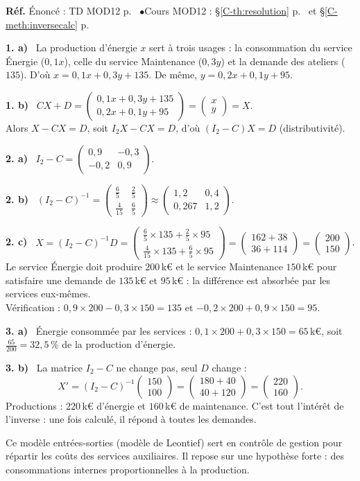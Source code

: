 \documentclass[a4paper,11pt]{article}
\newcommand{\M}[1]{\begin{pmatrix}#1\end{pmatrix}}
\newcommand{\cours}[1]{§\ref{C-#1} p.~\pageref{C-#1}}
\newcommand{\source}[2]{{\footnotesize\color{uimmgray}\textbf{Réf.} \enspace Énoncé : TD MOD12 p.~\pageref{T-#1} \enspace$\bullet$\enspace Cours MOD12 : #2}\par\smallskip}
\newcommand{\q}[1]{\textbf{\color{uimmblue}#1}\ }
\begin{document}
\begin{correction}
\source{exo:pb}{\cours{th:resolution} et \cours{meth:inversecalc}}
\q{1. a)} La production d'énergie $x$ sert à trois usages : la consommation du service Énergie ($0{,}1x$), celle du service Maintenance ($0{,}3y$) et la demande des ateliers ($135$). D'où $x = 0{,}1x + 0{,}3y + 135$. De même, $y = 0{,}2x + 0{,}1y + 95$.

\q{1. b)} $CX + D = \M{0{,}1x + 0{,}3y + 135\\ 0{,}2x + 0{,}1y + 95} = \M{x\\y} = X$.\\
Alors $X - CX = D$, soit $I_2X - CX = D$, d'où $(I_2 - C)X = D$ (distributivité).

\q{2. a)} $I_2 - C = \M{0{,}9 & -0{,}3\\ -0{,}2 & 0{,}9}$.

\q{2. b)} $(I_2 - C)^{-1} = \M{\frac65 & \frac25\\[2pt] \frac{4}{15} & \frac65}\approx\M{1{,}2 & 0{,}4\\ 0{,}267 & 1{,}2}$.

\q{2. c)} $X = (I_2 - C)^{-1}D = \M{\frac65\times 135 + \frac25\times 95\\[2pt] \frac{4}{15}\times 135 + \frac65\times 95} = \M{162 + 38\\ 36 + 114} = \M{200\\150}$.\\
Le service Énergie doit produire $200$\,k€ et le service Maintenance $150$\,k€ pour satisfaire une demande de $135$\,k€ et $95$\,k€ : la différence est absorbée par les services eux-mêmes.\\
Vérification : $0{,}9\times 200 - 0{,}3\times 150 = 135$ et $-0{,}2\times 200 + 0{,}9\times 150 = 95$.

\q{3. a)} Énergie consommée par les services : $0{,}1\times 200 + 0{,}3\times 150 = 65$\,k€, soit $\frac{65}{200} = 32{,}5\,\%$ de la production d'énergie.

\q{3. b)} La matrice $I_2 - C$ ne change pas, seul $D$ change :
\[
X' = (I_2 - C)^{-1}\M{150\\100} = \M{180 + 40\\ 40 + 120} = \M{220\\160}.
\]
Productions : $220$\,k€ d'énergie et $160$\,k€ de maintenance. C'est tout l'intérêt de l'inverse : une fois calculé, il répond à toutes les demandes.
\begin{piege}
Ce modèle entrées-sorties (modèle de Leontief) sert en contrôle de gestion pour répartir les coûts des services auxiliaires. Il repose sur une hypothèse forte : des consommations internes proportionnelles à la production.
\end{piege}
\end{correction}
\end{document}
